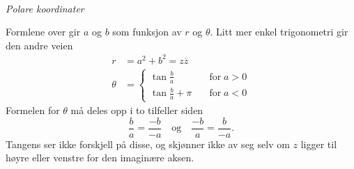 \begin{center}
\\
{\small \textit{Polare koordinater}}
\end{center}
Formlene over gir $a$ og $b$ som funksjon av $r$ og $\theta$. Litt mer enkel trigonometri gir den andre veien
\begin{align*}
r&=a^2+b^2=z\overline z \\
\theta&= \begin{cases} \tan \frac{b}{a} \quad &\text{for}\; a>0\\ \tan \frac{b}{a} + \pi \quad &\text{for}\;  a<0 \end{cases}
\end{align*}
Formelen for $\theta$ må deles opp i to tilfeller siden
\[
\frac{b}{a}=\frac{-b}{-a} \quad \text{og} \quad \frac{-b}{a}=\frac{b}{-a}.
\]
 Tangens ser ikke forskjell på disse, og skjønner ikke av seg selv om $z$ ligger til høyre eller venstre for den imaginære aksen.


